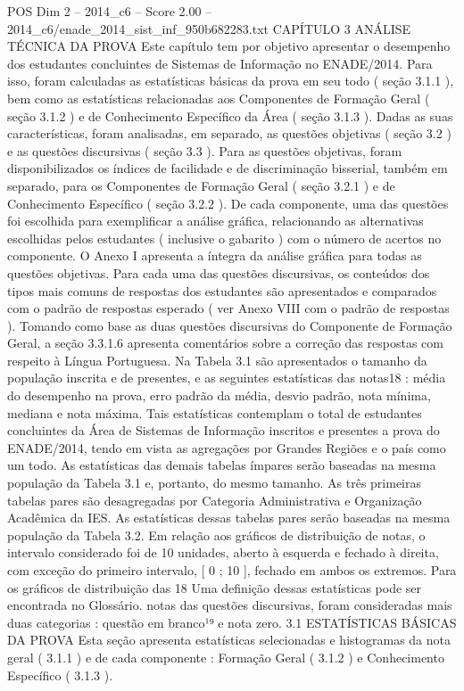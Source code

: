 \begin{textsample}{POS Dim 2 – 2014\_c6 – Score 2.00 – 2014\_c6/enade\_2014\_sist\_inf\_950b682283.txt}  \label{ex:f2_pos_226}
CAPÍTULO 3 ANÁLISE TÉCNICA DA PROVA Este capítulo tem por objetivo apresentar o desempenho dos estudantes concluintes de Sistemas de Informação no ENADE/2014.
Para isso, foram calculadas as estatísticas básicas da prova em seu todo ( seção 3.1.1 ), bem como as estatísticas relacionadas aos Componentes de Formação Geral ( seção 3.1.2 ) e de Conhecimento Específico da Área ( seção 3.1.3 ).
Dadas as suas características, foram analisadas, em separado, as questões objetivas ( seção 3.2 ) e as questões discursivas ( seção 3.3 ).
Para as questões objetivas, foram disponibilizados os índices de facilidade e de discriminação bisserial, também em separado, para os Componentes de Formação Geral ( seção 3.2.1 ) e de Conhecimento Específico ( seção 3.2.2 ).
De cada componente, uma das questões foi escolhida para exemplificar a análise gráfica, relacionando as alternativas escolhidas pelos estudantes ( inclusive o gabarito ) com o número de acertos no componente.
O Anexo I apresenta a íntegra da análise gráfica para todas as questões objetivas.
Para cada uma das questões discursivas, os conteúdos dos tipos mais comuns de respostas dos estudantes são apresentados e comparados com o padrão de respostas esperado ( ver Anexo VIII com o padrão de respostas ).
Tomando como base as duas questões discursivas do Componente de Formação Geral, a seção 3.3.1.6 apresenta comentários sobre a correção das respostas com respeito à Língua Portuguesa.
Na Tabela 3.1 são apresentados o tamanho da população inscrita e de presentes, e as seguintes estatísticas das notas18 : média do desempenho na prova, erro padrão da média, desvio padrão, nota mínima, mediana e nota máxima.
Tais estatísticas contemplam o total de estudantes concluintes da Área de Sistemas de Informação inscritos e presentes a prova do ENADE/2014, tendo em vista as agregações por Grandes Regiões e o país como um todo.
As estatísticas das demais tabelas ímpares serão baseadas na mesma população da Tabela 3.1 e, portanto, do mesmo tamanho.
As três primeiras tabelas pares são desagregadas por Categoria Administrativa e Organização Acadêmica da IES.
As estatísticas dessas tabelas pares serão baseadas na mesma população da Tabela 3.2.
Em relação aos gráficos de distribuição de notas, o intervalo considerado foi de 10 unidades, aberto à esquerda e fechado à direita, com exceção do primeiro intervalo, [ 0 ; 10 ], fechado em ambos os extremos.
Para os gráficos de distribuição das 18 Uma definição dessas estatísticas pode ser encontrada no Glossário. notas das questões discursivas, foram consideradas mais duas categorias : questão em branco¹⁹ e nota zero. 3.1 ESTATÍSTICAS BÁSICAS DA PROVA Esta seção apresenta estatísticas selecionadas e histogramas da nota geral ( 3.1.1 ) e de cada componente : Formação Geral ( 3.1.2 ) e Conhecimento Específico ( 3.1.3 ).

\end{textsample}
